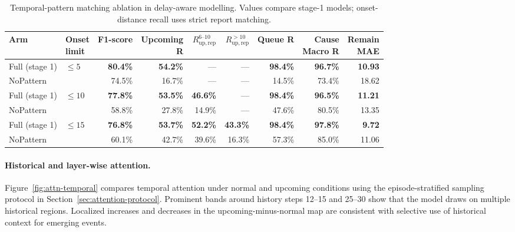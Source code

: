 \begin{table}[!htbp]
\centering
\caption{Temporal-pattern matching ablation in delay-aware modelling. Values compare stage-1 models; onset-distance recall uses strict report matching.}
\label{tab:delay-ablation-new}
\footnotesize
\setlength{\tabcolsep}{2.6pt}
\renewcommand{\arraystretch}{1.08}
\begin{fittable}
\begin{tabular*}{\linewidth}{@{\extracolsep{\fill}}llrrrrrrr@{}}
\toprule
Arm & \makecell{Onset\\limit} & F1-score & \makecell{Upcoming\\R} & $R_{\mathrm{up,rep}}^{6\text{--}10}$ & $R_{\mathrm{up,rep}}^{>10}$ & Queue R & \makecell{Cause\\Macro R} & \makecell{Remain\\MAE} \\
\midrule
Full (stage 1) & $\leq5$ & \textbf{80.4\%} & \textbf{54.2\%} & --- & --- & \textbf{98.4\%} & \textbf{96.7\%} & \textbf{10.93} \\
NoPattern & & 74.5\% & 16.7\% & --- & --- & 14.5\% & 73.4\% & 18.62 \\
\midrule
Full (stage 1) & $\leq10$ & \textbf{77.8\%} & \textbf{53.5\%} & \textbf{46.6\%} & --- & \textbf{98.4\%} & \textbf{96.5\%} & \textbf{11.21} \\
NoPattern & & 58.8\% & 27.8\% & 14.9\% & --- & 47.6\% & 80.5\% & 13.35 \\
\midrule
Full (stage 1) & $\leq15$ & \textbf{76.8\%} & \textbf{53.7\%} & \textbf{52.2\%} & \textbf{43.3\%} & \textbf{98.4\%} & \textbf{97.8\%} & \textbf{9.72} \\
NoPattern & & 60.1\% & 42.7\% & 39.6\% & 16.3\% & 57.3\% & 85.0\% & 11.06 \\
\bottomrule
\end{tabular*}
\end{fittable}
\end{table}

\FloatBarrier
\paragraph*{Historical and layer-wise attention.}
Figure~\ref{fig:attn-temporal} compares temporal attention under normal and upcoming conditions using the episode-stratified sampling protocol in Section~\ref{sec:attention-protocol}. Prominent bands around history steps 12--15 and 25--30 show that the model draws on multiple historical regions. Localized increases and decreases in the upcoming-minus-normal map are consistent with selective use of historical context for emerging events.


